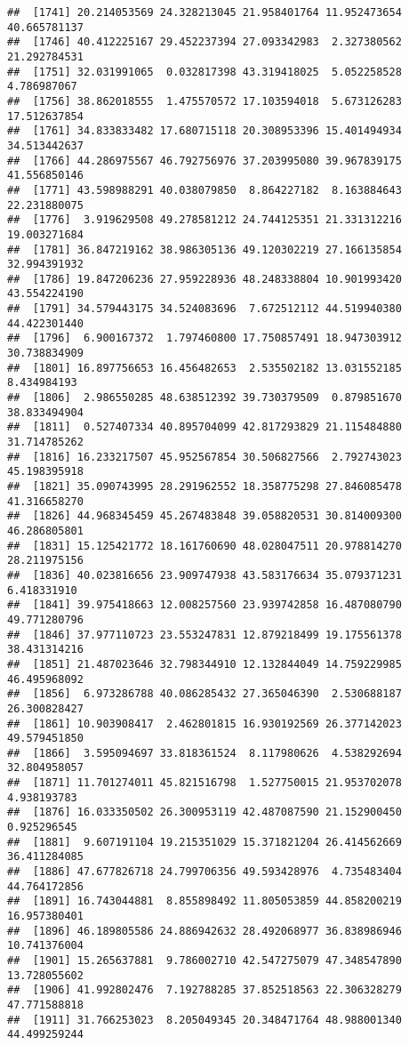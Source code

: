 \documentclass[
]{article}
\begin{document}
\begin{verbatim}
##  [1741] 20.214053569 24.328213045 21.958401764 11.952473654 40.665781137
##  [1746] 40.412225167 29.452237394 27.093342983  2.327380562 21.292784531
##  [1751] 32.031991065  0.032817398 43.319418025  5.052258528  4.786987067
##  [1756] 38.862018555  1.475570572 17.103594018  5.673126283 17.512637854
##  [1761] 34.833833482 17.680715118 20.308953396 15.401494934 34.513442637
##  [1766] 44.286975567 46.792756976 37.203995080 39.967839175 41.556850146
##  [1771] 43.598988291 40.038079850  8.864227182  8.163884643 22.231880075
##  [1776]  3.919629508 49.278581212 24.744125351 21.331312216 19.003271684
##  [1781] 36.847219162 38.986305136 49.120302219 27.166135854 32.994391932
##  [1786] 19.847206236 27.959228936 48.248338804 10.901993420 43.554224190
##  [1791] 34.579443175 34.524083696  7.672512112 44.519940380 44.422301440
##  [1796]  6.900167372  1.797460800 17.750857491 18.947303912 30.738834909
##  [1801] 16.897756653 16.456482653  2.535502182 13.031552185  8.434984193
##  [1806]  2.986550285 48.638512392 39.730379509  0.879851670 38.833494904
##  [1811]  0.527407334 40.895704099 42.817293829 21.115484880 31.714785262
##  [1816] 16.233217507 45.952567854 30.506827566  2.792743023 45.198395918
##  [1821] 35.090743995 28.291962552 18.358775298 27.846085478 41.316658270
##  [1826] 44.968345459 45.267483848 39.058820531 30.814009300 46.286805801
##  [1831] 15.125421772 18.161760690 48.028047511 20.978814270 28.211975156
##  [1836] 40.023816656 23.909747938 43.583176634 35.079371231  6.418331910
##  [1841] 39.975418663 12.008257560 23.939742858 16.487080790 49.771280796
##  [1846] 37.977110723 23.553247831 12.879218499 19.175561378 38.431314216
##  [1851] 21.487023646 32.798344910 12.132844049 14.759229985 46.495968092
##  [1856]  6.973286788 40.086285432 27.365046390  2.530688187 26.300828427
##  [1861] 10.903908417  2.462801815 16.930192569 26.377142023 49.579451850
##  [1866]  3.595094697 33.818361524  8.117980626  4.538292694 32.804958057
##  [1871] 11.701274011 45.821516798  1.527750015 21.953702078  4.938193783
##  [1876] 16.033350502 26.300953119 42.487087590 21.152900450  0.925296545
##  [1881]  9.607191104 19.215351029 15.371821204 26.414562669 36.411284085
##  [1886] 47.677826718 24.799706356 49.593428976  4.735483404 44.764172856
##  [1891] 16.743044881  8.855898492 11.805053859 44.858200219 16.957380401
##  [1896] 46.189805586 24.886942632 28.492068977 36.838986946 10.741376004
##  [1901] 15.265637881  9.786002710 42.547275079 47.348547890 13.728055602
##  [1906] 41.992802476  7.192788285 37.852518563 22.306328279 47.771588818
##  [1911] 31.766253023  8.205049345 20.348471764 48.988001340 44.499259244

\end{verbatim}
\end{document}
